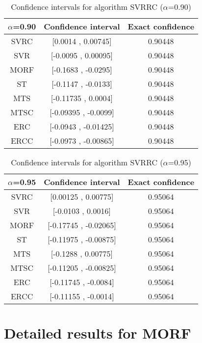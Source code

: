 \documentclass[a4paper,10pt]{article}
\begin{document}
\begin{table}[!htp]
\centering\small
\begin{tabular}{
|c|c|c|}
\hline
 $\alpha$=0.90 & Confidence interval & Exact confidence \\ \hline 
SVRC & [0.0014 , 0.00745] & 0.90448\\ \hline 
SVR & [-0.0095 , 0.00095] & 0.90448\\ \hline 
MORF & [-0.1683 , -0.0295] & 0.90448\\ \hline 
ST & [-0.1147 , -0.0133] & 0.90448\\ \hline 
MTS & [-0.11735 , 0.0004] & 0.90448\\ \hline 
MTSC & [-0.09395 , -0.0099] & 0.90448\\ \hline 
ERC & [-0.0943 , -0.01425] & 0.90448\\ \hline 
ERCC & [-0.0973 , -0.00865] & 0.90448\\ \hline 

\end{tabular}
\caption{Confidence intervals for algorithm SVRRC ($\alpha$=0.90)}
\end{table}
\begin{table}[!htp]
\centering\small
\begin{tabular}{
|c|c|c|}
\hline
 $\alpha$=0.95 & Confidence interval & Exact confidence \\ \hline 
SVRC & [0.00125 , 0.00775] & 0.95064\\ \hline 
SVR & [-0.0103 , 0.0016] & 0.95064\\ \hline 
MORF & [-0.17745 , -0.02065] & 0.95064\\ \hline 
ST & [-0.11975 , -0.00875] & 0.95064\\ \hline 
MTS & [-0.1288 , 0.00775] & 0.95064\\ \hline 
MTSC & [-0.11205 , -0.00825] & 0.95064\\ \hline 
ERC & [-0.11745 , -0.0084] & 0.95064\\ \hline 
ERCC & [-0.11155 , -0.0014] & 0.95064\\ \hline 

\end{tabular}
\caption{Confidence intervals for algorithm SVRRC ($\alpha$=0.95)}
\end{table}

 \clearpage 


\section{Detailed results for MORF}
\end{document}
